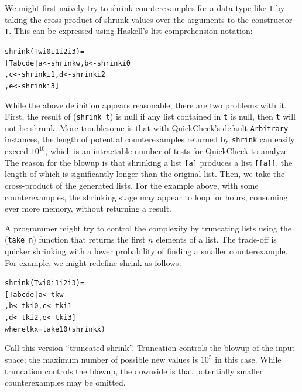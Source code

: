\documentclass{sigplanconf}
\newenvironment{code}{\begin{alltt}}{\end{alltt}}
\newcommand{\ttp}[1]{\texttt{#1}}
\begin{document}
We might first naively try to shrink counterexamples for a data type like
\ttp{T} by taking the cross-product of shrunk values over the arguments to the
constructor \ttp{T}.  This can be expressed using Haskell's list-comprehension
notation:
%
\begin{code}
shrink (T w i0 i1 i2 i3) =
  [ T a b c d e | a <- shrink w,  b <- shrink i0
                , c <- shrink i1, d <- shrink i2
                , e <- shrink i3 ]
\end{code}
%
\noindent
While the above definition appears reasonable, there are two problems with it.
First, the result of (\ttp{shrink t}) is null if any list contained in \ttp{t}
is null, then \ttp{t} will not be shrunk.  More troublesome is that with
QuickCheck's default \ttp{Arbitrary} instances, the length of potential
counterexamples returned by \ttp{shrink} can easily exceed $10^{10}$, which is
an intractable number of tests for QuickCheck to analyze.  The reason for the
blowup is that shrinking a list \ttp{[a]} produces a list \ttp{[[a]]}, the
length of which is significantly longer than the original list.  Then, we take
the cross-product of the generated lists.  For the example above, with some
counterexamples, the shrinking stage may appear to loop for hours, consuming
ever more memory, without returning a result.

A programmer might try to control the complexity by truncating lists using the
(\ttp{take n}) function that returns the first $n$ elements of a list.  The
trade-off is quicker shrinking with a lower probability of finding a smaller
counterexample.  For example, we might redefine shrink as follows:
%
\begin{code}
shrink (T w i0 i1 i2 i3) =
  [ T a b c d e | a <- tk w
                , b <- tk i0, c <- tk i1
                , d <- tk i2, e <- tk i3 ]
  where tk x = take 10 (shrink x)
\end{code}
%
\noindent
Call this version ``truncated shrink''.  Truncation controls the blowup of the
input-space; the maximum number of possible new values is $10^5$ in this case.
While truncation controls the blowup, the downside is that potentially smaller
counterexamples may be omitted.
\end{document}
